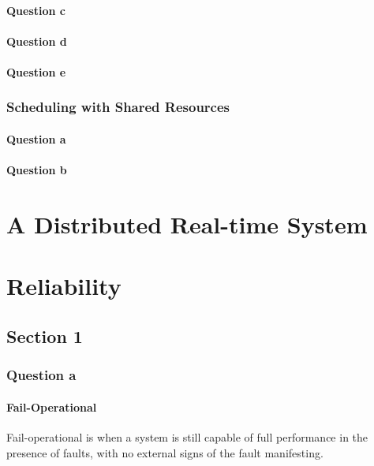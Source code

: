 \documentclass[]{report}
\begin{document}
			
			
			\subsubsection{Question c}
			
			
			
			\subsubsection{Question d}
			\subsubsection{Question e}
		
		\subsection{Scheduling with Shared Resources}
			\subsubsection{Question a}
			\subsubsection{Question b}
	
	\chapter{A Distributed Real-time System}
		
	
	
	\chapter{Reliability}
		\section{Section 1}
			\subsection{Question a}
				\subsubsection{Fail-Operational}
				Fail-operational is when a system is still capable of full performance in the presence of faults, with no external signs of the fault manifesting. 
				
\end{document}
